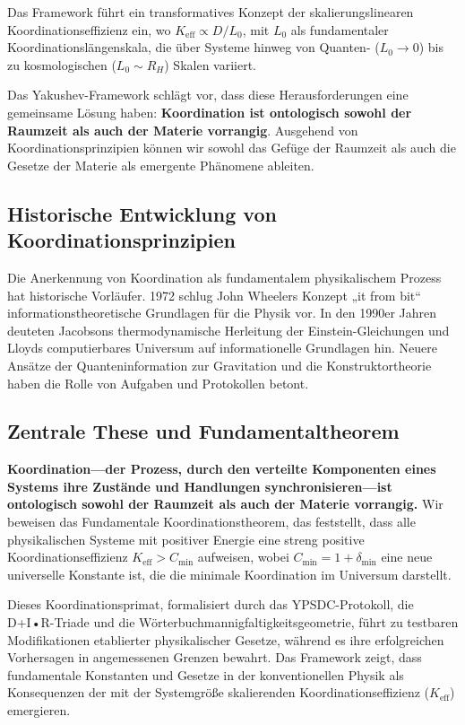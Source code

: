 \documentclass[11pt,a4paper]{article}
\begin{document}
	Das Framework führt ein transformatives Konzept der skalierungslinearen Koordinationseffizienz ein,
	wo $K_{\mathrm{eff}} \propto D/L_0$, mit $L_0$ als fundamentaler Koordinationslängenskala, die über Systeme hinweg von Quanten- ($L_0 \to 0$) bis zu kosmologischen ($L_0 \sim R_H$) Skalen variiert.
	
	
	Das Yakushev-Framework schlägt vor, dass diese Herausforderungen eine gemeinsame Lösung haben: \textbf{Koordination ist ontologisch sowohl der Raumzeit als auch der Materie vorrangig}. Ausgehend von Koordinationsprinzipien können wir sowohl das Gefüge der Raumzeit als auch die Gesetze der Materie als emergente Phänomene ableiten.
	
	\subsection{Historische Entwicklung von Koordinationsprinzipien}
	Die Anerkennung von Koordination als fundamentalem physikalischem Prozess hat historische Vorläufer. 1972 schlug John Wheelers Konzept „it from bit“ informationstheoretische Grundlagen für die Physik vor. In den 1990er Jahren deuteten Jacobsons thermodynamische Herleitung der Einstein-Gleichungen und Lloyds computierbares Universum auf informationelle Grundlagen hin. Neuere Ansätze der Quanteninformation zur Gravitation und die Konstruktortheorie haben die Rolle von Aufgaben und Protokollen betont.
	
	\subsection{Zentrale These und Fundamentaltheorem}
	
	\textbf{Koordination—der Prozess, durch den verteilte Komponenten eines Systems ihre Zustände und Handlungen synchronisieren—ist ontologisch sowohl der Raumzeit als auch der Materie vorrangig.} Wir beweisen das Fundamentale Koordinationstheorem, das feststellt, dass alle physikalischen Systeme mit positiver Energie eine streng positive Koordinationseffizienz $K_{\mathrm{eff}} > C_{\min}$ aufweisen, wobei $C_{\min} = 1 + \delta_{\min}$ eine neue universelle Konstante ist, die die minimale Koordination im Universum darstellt.
	
	Dieses Koordinationsprimat, formalisiert durch das YPSDC-Protokoll, die D+I•R-Triade und die Wörterbuchmannigfaltigkeitsgeometrie, führt zu testbaren Modifikationen etablierter physikalischer Gesetze, während es ihre erfolgreichen Vorhersagen in angemessenen Grenzen bewahrt. Das Framework zeigt, dass fundamentale Konstanten und Gesetze in der konventionellen Physik als Konsequenzen der mit der Systemgröße skalierenden Koordinationseffizienz ($K_{\mathrm{eff}}$) emergieren.
	
\end{document}
